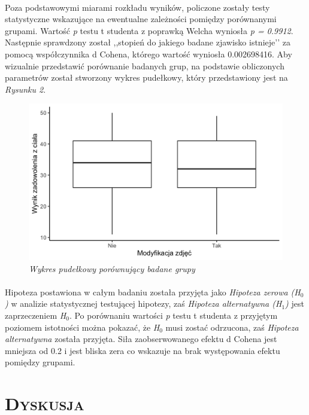 \documentclass[12pt,a4paper,final,oneside,onecolumn,titlepage]{article}
\begin{document}
\paragraph{}
Poza podstawowymi miarami rozkładu wyników, policzone zostały testy statystyczne wskazujące na ewentualne zależności pomiędzy porównanymi grupami. Wartość \textit {p} testu t studenta z poprawką Welcha wyniosła \textit{p = 0.9912}. Następnie sprawdzony został ,,stopień do jakiego badane zjawisko istnieje’’ \citep[s. 5]{cohen_statistical_1977} za pomocą współczynnika d Cohena, którego wartość wyniosła 0.002698416. Aby wizualnie przedstawić porównanie badanych grup, na podstawie obliczonych parametrów został stworzony wykres pudełkowy, który przedstawiony jest na \textit{Rysunku 2}.
\begin{figure}[h!]
\caption{\textit{Wykres pudełkowy porównujący badane grupy}}
\centering
\includegraphics[scale=0.25]{boxwhisk}
\end{figure}
\paragraph{}
Hipoteza postawiona w całym badaniu została przyjęta jako \textit{Hipoteza zerowa (H$_0$)} w analizie statystycznej testującej hipotezy, zaś \textit{Hipoteza alternatywna (H$_1$)} jest zaprzeczeniem \textit{H$_0$}. Po porównaniu wartości \textit{p} testu t studenta z przyjętym poziomem istotności można pokazać, że \textit{H$_0$} musi zostać odrzucona, zaś \textit{Hipoteza alternatywna} została przyjęta. Siła zaobserwowanego efektu d Cohena jest mniejsza od 0.2 i jest bliska zera co wskazuje na brak występowania efektu pomiędzy grupami.
\section*{\large{\textbf{\textsc{Dyskusja}}}}
\end{document}

